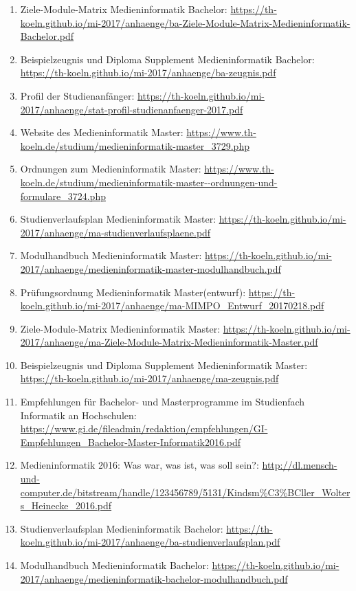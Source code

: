 \documentclass[BCOR12mm,DIV11,titlepage,a4paper,oneside,10pt]{scrbook}
\begin{document}
\begin{sloppypar}
\begin{flushleft}
\begin{enumerate}
\item{Ziele-Module-Matrix Medieninformatik Bachelor: \url{https://th-koeln.github.io/mi-2017/anhaenge/ba-Ziele-Module-Matrix-Medieninformatik-Bachelor.pdf} } 
\item{Beispielzeugnis und Diploma Supplement Medieninformatik Bachelor: \url{https://th-koeln.github.io/mi-2017/anhaenge/ba-zeugnis.pdf} } 
\item{Profil der Studienanfänger: \url{https://th-koeln.github.io/mi-2017/anhaenge/stat-profil-studienanfaenger-2017.pdf} } 
\item{Website des Medieninformatik Master: \url{https://www.th-koeln.de/studium/medieninformatik-master\_3729.php} } 
\item{Ordnungen zum Medieninformatik Master: \url{https://www.th-koeln.de/studium/medieninformatik-master--ordnungen-und-formulare\_3724.php} } 
\item{Studienverlaufsplan Medieninformatik Master: \url{https://th-koeln.github.io/mi-2017/anhaenge/ma-studienverlaufsplaene.pdf} } 
\item{Modulhandbuch Medieninformatik Master: \url{https://th-koeln.github.io/mi-2017/anhaenge/medieninformatik-master-modulhandbuch.pdf} } 
\item{Prüfungsordnung Medieninformatik Master(entwurf): \url{https://th-koeln.github.io/mi-2017/anhaenge/ma-MIMPO\_Entwurf\_20170218.pdf} } 
\item{Ziele-Module-Matrix Medieninformatik Master: \url{https://th-koeln.github.io/mi-2017/anhaenge/ma-Ziele-Module-Matrix-Medieninformatik-Master.pdf} } 
\item{Beispielzeugnis und Diploma Supplement Medieninformatik Master: \url{https://th-koeln.github.io/mi-2017/anhaenge/ma-zeugnis.pdf} } 
\item{Empfehlungen für Bachelor- und Masterprogramme im Studienfach Informatik an Hochschulen: \url{https://www.gi.de/fileadmin/redaktion/empfehlungen/GI-Empfehlungen\_Bachelor-Master-Informatik2016.pdf} } 
\item{Medieninformatik 2016: Was war, was ist, was soll sein?: \url{http://dl.mensch-und-computer.de/bitstream/handle/123456789/5131/Kindsm\%C3\%BCller\_Wolters\_Heinecke\_2016.pdf} } 
\item{Studienverlaufsplan Medieninformatik Bachelor: \url{https://th-koeln.github.io/mi-2017/anhaenge/ba-studienverlaufsplan.pdf} } 
\item{Modulhandbuch Medieninformatik Bachelor: \url{https://th-koeln.github.io/mi-2017/anhaenge/medieninformatik-bachelor-modulhandbuch.pdf} } 

\end{enumerate}
\end{flushleft}
\end{sloppypar}
\end{document}

